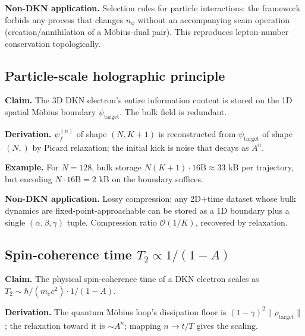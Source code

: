 \documentclass[11pt,a4paper]{article}
\theoremstyle{definition}
\newcommand{\psit}{\psi_{\mathrm{target}}}
\newcommand{\contr}{A}
\begin{document}
\begin{tcolorbox}[applbox]
\textbf{Non-DKN application.}
Selection rules for particle interactions: the framework forbids
any process that changes $n_\phi$ without an accompanying seam
operation (creation/annihilation of a M\"obius-dual pair). This
reproduces lepton-number conservation topologically.
\end{tcolorbox}

\subsection{Particle-scale holographic principle}\label{nov:15}

\begin{tcolorbox}[noveltybox]
\textbf{Claim.} The 3D DKN electron's entire information content is
stored on the 1D spatial M\"obius boundary $\psit$. The bulk field is
redundant.
\end{tcolorbox}

\textbf{Derivation.} $\psi_f^{(n)}$ of shape $(N, K{+}1)$ is reconstructed
from $\psi_{\mathrm{target}}$ of shape $(N,)$ by Picard relaxation; the
initial kick is noise that decays as $A^n$.

\textbf{Example.} For $N = 128$, bulk storage
$N(K{+}1) \cdot 16\text{B} \approx 33$ kB per trajectory, but encoding
$N \cdot 16\text{B} = 2$ kB on the boundary suffices.

\begin{tcolorbox}[applbox]
\textbf{Non-DKN application.}
Lossy compression: any 2D+time dataset whose bulk dynamics are
fixed-point-approachable can be stored as a 1D boundary plus a
single $(\alpha,\beta,\gamma)$ tuple. Compression ratio
$\mathcal{O}(1/K)$, recovered by relaxation.
\end{tcolorbox}

\subsection{Spin-coherence time $T_2 \propto 1/(1-\contr)$}\label{nov:16}

\begin{tcolorbox}[noveltybox]
\textbf{Claim.} The physical spin-coherence time of a DKN electron
scales as $T_2 \sim \hbar/(m_ec^2) \cdot 1/(1-\contr)$.
\end{tcolorbox}

\textbf{Derivation.} The quantum M\"obius loop's dissipation floor is
$(1-\gamma)^2\|\rho_{\mathrm{target}}\|$; the relaxation toward it is
$\sim\contr^n$; mapping $n \to t/T$ gives the scaling.
\end{document}
